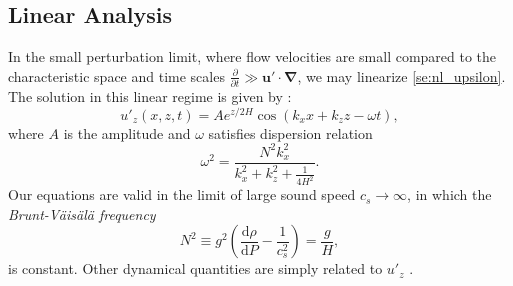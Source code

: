 \documentclass[
        fleqn,
        usenatbib,
    ]{mnras}
\newcommand*{\rd}[2]{\frac{\mathrm{d}#1}{\mathrm{d}#2}}
\newcommand*{\pd}[2]{\frac{\partial#1}{\partial#2}}
\newcommand*{\p}[1]{\left(#1\right)}
\newcommand*{\bm}[1]{\mathbf{#1}}
\begin{document}
\subsection{Linear Analysis}

In the small perturbation limit, where flow velocities are small compared to the
characteristic space and time scales $\pd{}{t} \gg \bm{u}' \cdot
\bm{\nabla}$, we may linearize \autoref{se:nl_upsilon}. The solution in this
linear regime is given by \citep{drazin,sutherland0}:
\begin{equation}
    u'_z\p{x, z, t} = Ae^{z/2H}\cos\p{k_{x}x + k_{z}z - \omega t},
        \label{eq:k0z_sign}
\end{equation}
where $A$ is the amplitude and $\omega$ satisfies dispersion relation
\begin{equation}
    \omega^2 = \frac{N^2k_{x}^2}{k_{x}^2 + k_{z}^2 + \frac{1}{4H^2}}.
        \label{eq:disp_rel}
\end{equation}
Our equations are valid in the limit of large sound speed $c_s \to \infty$, in
which the \emph{Brunt-V\"ais\"al\"a frequency}
\begin{equation}
    N^2 \equiv g^2\p{\rd{\rho}{P} - \frac{1}{c_s^2}} = \frac{g}{H},
\end{equation}
is constant. Other dynamical quantities are simply related to $u'_z$ \citep[see
e.g.][]{sutherland0}.
\end{document}
